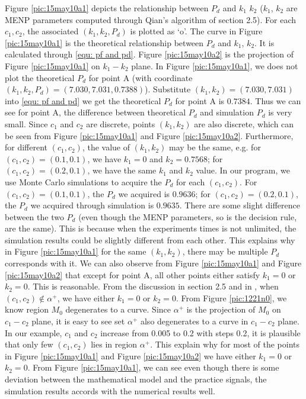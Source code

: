 Figure \ref{pic:15may10a1} depicts the relationship between  $P_d$ and $k_1$ $k_2$ ($k_1$, $k_2$ are MENP parameters computed through Qian's algorithm of section 2.5).
For each $c_1, c_2$, the associated $(k_1, k_2, P_d)$ is plotted as `o'. The curve in Figure \ref{pic:15may10a1} is the theoretical relationship between $P_d$ and $k_1$, $k_2$. It is calculated through \eqref{equ: pf and pd}. Figure \ref{pic:15may10a2} is the projection of Figure \ref{pic:15may10a1} on $k_1-k_2$ plane.
In Figure \ref{pic:15may10a1}, we does not plot the theoretical $P_d$ for point A (with coordinate $(k_1, k_2, P_d) = (7.030, 7.031, 0.7388)$). Substitute $(k_1, k_2) = (7.030, 7.031)$ into \eqref{equ: pf and pd} we get the theoretical $P_d$ for point A is $0.7384$. Thus we can see for point A, the difference between theoretical $P_d$ and simulation $P_d$ is very small. 
Since $c_1$ and $c_2$ are discrete, points $(k_1, k_2)$ are also discrete, which can be seen from Figure \ref{pic:15may10a1} and Figure \ref{pic:15may10a2}. 
Furthermore, for different $(c_1, c_2)$, the value of $(k_1, k_2)$ may be the same, 
e.g. for $(c_1, c_2) = (0.1, 0.1)$, we have $k_1 = 0$ and $k_2  = 0.7568$; for $(c_1, c_2) = (0.2, 0.1)$, we have the same $k_1$ and $k_2$ value. 
In our program, we use Monte Carlo simulations to acquire the $P_d$ for each $(c_1, c_2)$.  For  $(c_1, c_2) = (0.1, 0.1)$, the $P_d$ we acquired is $0.9636$; for $(c_1, c_2) = (0.2, 0.1)$, the $P_d$ we acquired through simulation is $0.9635$. There are some slight difference between the two $P_d$ (even though the MENP parameters, so is the decision rule, are the same). This is because when the experiments times is not unlimited, the simulation results could be slightly different from each other. This explains why in Figure \ref{pic:15may10a1} for the same $(k_1, k_2)$, there may be multiple $P_d$ corresponds with it.  
We can also observe from Figure \ref{pic:15may10a1} and Figure \ref{pic:15may10a2} that except for point A, all other points either satisfy $k_1 = 0$ or $k_2 = 0$. This is reasonable. From the discussion in section 2.5 and in \cite{zhang2000efficient}, when $(c_1, c_2) \notin \alpha^+$, we have either $k_1 = 0$ or $k_2 = 0$. From Figure \ref{pic:1221n0}, we know region $M_0$ degenerates to a curve. Since $\alpha^+$ is the projection of $M_0$ on $c_1-c_2$ plane, it is easy to see set $\alpha^+$ also degenerates to a curve in $c_1-c_2$ plane. In our example, $c_1$ and $c_2$ increase from 0.005 to 0.2 with steps 0.2, it is plausible that only few $(c_1, c_2)$ lies in region $\alpha^+$. This explain why for most of the points in Figure \ref{pic:15may10a1} and Figure \ref{pic:15may10a2} we have either $k_1 = 0$ or $k_2 = 0$.
From Figure \ref{pic:15may10a1}, we can see even though there is some deviation between the mathematical model and the practice signals, the simulation results accords with the numerical results well. 

